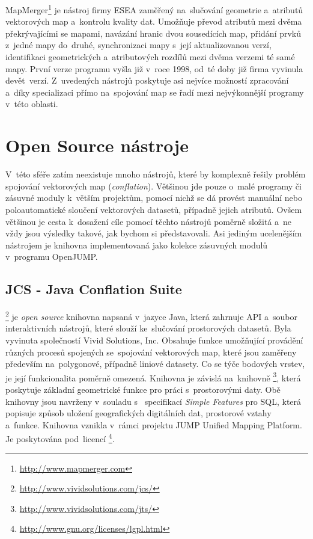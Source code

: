 MapMerger\footnote{\url{http://www.mapmerger.com}} je  nástroj firmy 
ESEA zaměřený na~slučování geometrie a~atributů vektorových map a~kontrolu 
kvality dat. Umožňuje převod atributů mezi dvěma překrývajícími se mapami, 
navázání hranic dvou sousedících map, přidání prvků z~jedné mapy do~druhé, 
synchronizaci mapy s~její aktualizovanou verzí, identifikaci geometrických 
a~atributových rozdílů mezi dvěma verzemi té samé mapy. První verze programu 
vyšla již v~roce 1998, od~té doby již firma vyvinula devět~verzí. Z~uvedených 
nástrojů poskytuje asi nejvíce možností zpracování a~díky specializaci 
přímo na~spojování map se řadí mezi nejvýkonnější programy v~této oblasti. 


\section{Open Source nástroje}
\label{open-source}

V~této sféře zatím neexistuje mnoho nástrojů, které by komplexně řešily problém
spojování vektorových map (\textit{conflation}). Většinou jde pouze o~malé 
programy či zásuvné moduly k~větším projektům, pomocí nichž se dá provést manuální
nebo poloautomatické sloučení vektorových datasetů, případně jejich atributů. 
Ovšem většinou je cesta k~dosažení cíle pomocí těchto nástrojů poměrně složitá 
a~ne vždy jsou výsledky takové, jak bychom si představovali. Asi jediným 
ucelenějším nástrojem je knihovna  implementovaná jako kolekce 
zásuvných modulů v~programu OpenJUMP.


\subsection{JCS - Java Conflation Suite}
\label{jcs}

\footnote{\url{http://www.vividsolutions.com/jcs/}} je \textit{open source}
knihovna napsaná v~jazyce Java, která zahrnuje API a~soubor interaktivních nástrojů, 
které slouží ke~slučování prostorových datasetů. Byla vyvinuta společností Vivid 
Solutions, Inc. Obsahuje funkce umožňující provádění různých procesů spojených 
se~spojování vektorových map, které jsou zaměřeny především na~polygonové, případně 
liniové datasety. Co se týče bodových vrstev, je její funkcionalita poměrně omezená. 
Knihovna  je závislá na~knihovně 
\footnote{\url{http://www.vividsolutions.com/jts/}}, která poskytuje 
základní geometrické funkce pro práci s~prostorovými daty. Obě knihovny jsou navrženy 
v~souladu s~ specifikací \textit{Simple Features} pro SQL,
která popisuje způsob uložení geografic\-kých digitálních dat, pro\-storové vztahy 
a~funkce. Knihovna  vznikla v~rámci projektu JUMP Unified Mapping Platform. Je 
poskytována pod~licencí 
\footnote{\url{http://www.gnu.org/licenses/lgpl.html}}.

